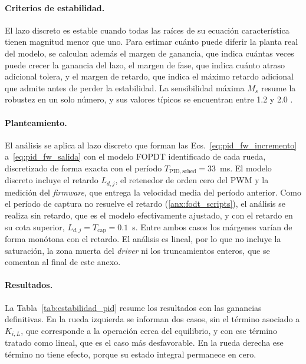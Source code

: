 \begin{appendices}
\paragraph{Criterios de estabilidad.} El lazo discreto es estable cuando todas
las raíces de su ecuación característica tienen magnitud menor que uno. Para
estimar cuánto puede diferir la planta real del modelo, se calculan además el
margen de ganancia, que indica cuántas veces puede crecer la ganancia del lazo,
el margen de fase, que indica cuánto atraso adicional tolera, y el margen de
retardo, que indica el máximo retardo adicional que admite antes de perder la
estabilidad. La sensibilidad máxima $M_s$ resume la robustez en un solo número,
y sus valores típicos se encuentran entre 1.2 y 2.0
\citep[Sec.~5]{wittenmark_ifac_computer}.

\paragraph{Planteamiento.} El análisis se aplica al lazo discreto que forman las
Ecs.~\eqref{eq:pid_fw_incremento} a~\eqref{eq:pid_fw_salida} con el modelo FOPDT
identificado de cada rueda, discretizado de forma exacta con el período
$T_{\mathrm{PID,sched}}=33$~ms. El modelo discreto incluye el retardo $L_{d,j}$,
el retenedor de orden cero del PWM y la medición del \textit{firmware}, que
entrega la velocidad media del período anterior. Como el período de captura no
resuelve el retardo (\ref{anx:fodt_scripts}), el análisis se realiza sin
retardo, que es el modelo efectivamente ajustado, y con el retardo en su cota
superior, $L_{d,j}=T_{\mathrm{cap}}=0.1$~s. Entre ambos casos los márgenes varían
de forma monótona con el retardo. El análisis es lineal, por lo que no
incluye la saturación, la zona muerta del \textit{driver} ni los truncamientos
enteros, que se comentan al final de este anexo.

\paragraph{Resultados.} La Tabla~\ref{tab:estabilidad_pid} resume los
resultados con las ganancias definitivas. En la rueda izquierda se informan dos
casos, sin el término asociado a $K_{i,L}$, que corresponde a la operación cerca
del equilibrio, y con ese término tratado como lineal, que es el caso más
desfavorable. En la rueda derecha ese término no tiene efecto, porque su estado
integral permanece en cero.


\end{appendices}
